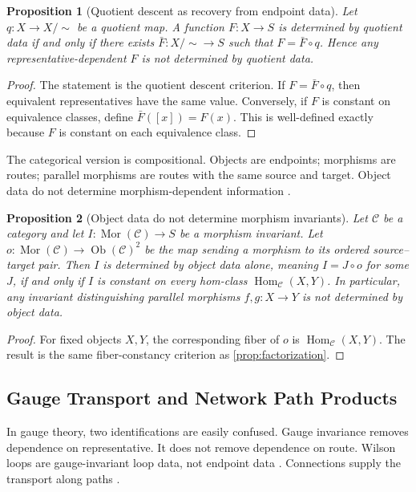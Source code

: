 \documentclass[12pt]{article}
\newtheorem{proposition}[proposition]{Proposition}
\newcommand{\calC}{\mathcal{C}}
\newcommand{\Mor}{\operatorname{Mor}}
\newcommand{\Ob}{\operatorname{Ob}}
\newcommand{\Hom}{\operatorname{Hom}}
\newcommand{\citep}[1]{\cite{#1}}
\begin{document}
\begin{proposition}[Quotient descent as recovery from endpoint data]
\label{prop:quotient-descent}
Let $q:X\to X/{\sim}$ be a quotient map. A function $F:X\to S$ is
determined by quotient data if and only if there exists
$\bar F:X/{\sim}\to S$ such that $F=\bar F\circ q$. Hence any
representative-dependent $F$ is not determined by quotient data.
\end{proposition}

\begin{proof}
The statement is the quotient descent criterion. If $F=\bar F\circ q$,
then equivalent representatives have the same value. Conversely, if $F$
is constant on equivalence classes, define $\bar F([x])=F(x)$. This is
well-defined exactly because $F$ is constant on each equivalence class.
\end{proof}

The categorical version is compositional. Objects are endpoints;
morphisms are routes; parallel morphisms are routes with the same source
and target. Object data do not determine morphism-dependent information
\citep{EilenbergMacLane1945,MacLane1998}.

\begin{proposition}[Object data do not determine morphism invariants]
\label{prop:category-realization}
Let $\calC$ be a category and let
$I:\Mor(\calC)\to S$ be a morphism invariant. Let
$o:\Mor(\calC)\to\Ob(\calC)^2$ be the map sending
a morphism to its ordered source--target pair. Then $I$ is determined
by object data alone, meaning $I=J\circ o$ for some $J$, if and only if
$I$ is constant on every hom-class $\Hom_{\calC}(X,Y)$.
In particular, any invariant distinguishing parallel morphisms
$f,g:X\to Y$ is not determined by object data.
\end{proposition}

\begin{proof}
For fixed objects $X,Y$, the corresponding fiber of $o$ is
$\Hom_{\calC}(X,Y)$. The result is the same fiber-constancy criterion as
\cref{prop:factorization}.
\end{proof}

\subsection{Gauge Transport and Network Path Products}
\label{subsec:gauge-networks}

In gauge theory, two identifications are easily confused. Gauge
invariance removes dependence on representative. It does not remove
dependence on route. Wilson loops are gauge-invariant loop data, not
endpoint data \citep{Wilson1974}. Connections supply the transport along
paths \citep{Ehresmann1950,Nakahara2003}.
\end{document}
